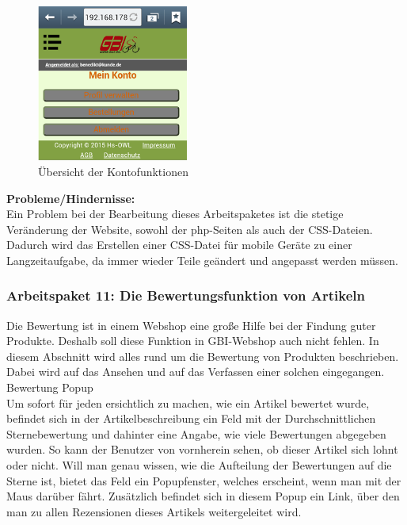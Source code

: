 \begin{figure}[H]
\begin{center}
\includegraphics[width=5cm]{Bilder/Michael_Abbildung9-UebersichtDerKontofunktionen.png}
\end{center}
\caption{Übersicht der Kontofunktionen}
\end{figure}

\newpage
\textbf{Probleme/Hindernisse:}
\\
Ein Problem bei der Bearbeitung dieses Arbeitspaketes ist die stetige Veränderung der Website, sowohl der php-Seiten als auch der CSS-Dateien. Dadurch wird das Erstellen einer CSS-Datei für mobile Geräte zu einer Langzeitaufgabe, da immer wieder Teile geändert und angepasst werden müssen. 


\subsubsection{Arbeitspaket 11: Die Bewertungsfunktion von Artikeln}

Die Bewertung ist in einem Webshop eine große Hilfe bei der Findung guter Produkte. Deshalb soll diese Funktion in GBI-Webshop auch nicht fehlen. 
In diesem Abschnitt wird alles rund um die Bewertung von Produkten beschrieben. Dabei wird auf das Ansehen und auf das Verfassen einer solchen eingegangen.
\\
Bewertung Popup
\\
Um sofort für jeden ersichtlich zu machen, wie ein Artikel bewertet wurde, befindet sich in der Artikelbeschreibung ein Feld mit der Durchschnittlichen Sternebewertung und dahinter eine Angabe, wie viele Bewertungen abgegeben wurden. So kann der Benutzer von vornherein sehen, ob dieser Artikel sich lohnt oder nicht. Will man genau wissen, wie die Aufteilung der Bewertungen auf die Sterne ist, bietet das Feld ein Popupfenster, welches erscheint, wenn man mit der Maus darüber fährt. Zusätzlich befindet sich in diesem Popup ein Link, über den man zu allen Rezensionen dieses Artikels weitergeleitet wird.

